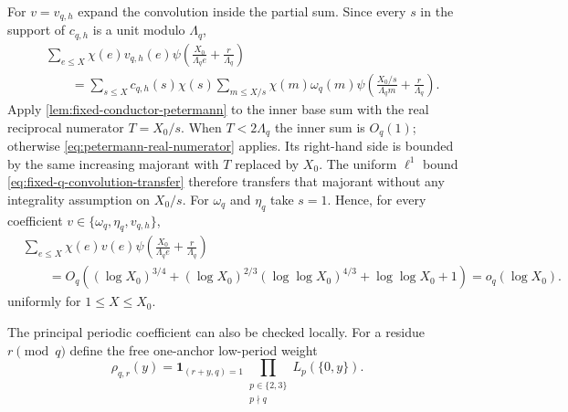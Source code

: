 \documentclass[11pt]{article}
\theoremstyle{definition}
\theoremstyle{remark}
\newcommand{\1}{\mathbf 1}
\begin{document}
For $v=v_{q,h}$ expand the convolution inside the partial sum.  Since every
$s$ in the support of $c_{q,h}$ is a unit modulo $\Lambda_q$,
\begin{align*}
&\sum_{e\le X}\chi(e)v_{q,h}(e)
\psi\!\left(\frac{X_0}{\Lambda_q e}+\frac r{\Lambda_q}\right)\\
&\qquad=\sum_{s\le X}c_{q,h}(s)\chi(s)
\sum_{m\le X/s}\chi(m)\omega_q(m)
\psi\!\left(\frac{X_0/s}{\Lambda_q m}+\frac r{\Lambda_q}\right).
\end{align*}
Apply \cref{lem:fixed-conductor-petermann} to the inner base sum with the real
reciprocal numerator $T=X_0/s$.  When $T<2\Lambda_q$ the inner sum is
$O_q(1)$; otherwise \eqref{eq:petermann-real-numerator} applies.  Its right-hand
side is bounded by the same increasing majorant with $T$ replaced by $X_0$.
The uniform $\ell^1$ bound \eqref{eq:fixed-q-convolution-transfer} therefore
transfers that majorant without any integrality assumption on $X_0/s$.
For $\omega_q$ and $\eta_q$ take $s=1$.  Hence, for every coefficient
$v\in\{\omega_q,\eta_q,v_{q,h}\}$,
\begin{equation}\label{eq:petermann-q}
\begin{aligned}
&\sum_{e\le X}\chi(e)v(e)
\psi\!\left(\frac{X_0}{\Lambda_q e}+\frac r{\Lambda_q}\right)\\
&\qquad=O_q\!\left(
(\log X_0)^{3/4}
+(\log X_0)^{2/3}(\log\log X_0)^{4/3}
+\log\log X_0+1
\right)
=o_q(\log X_0).
\end{aligned}
\end{equation}
uniformly for $1\le X\le X_0$.

The principal periodic coefficient can also be checked locally.  For a residue
$r\pmod q$ define the free one-anchor low-period weight
\begin{equation}\label{eq:rho-free-q}
\rho_{q,r}(y)
=\1_{(r+y,q)=1}
\prod_{\substack{p\in\{2,3\}\\p\nmid q}}L_p(\{0,y\}).
\end{equation}
\end{document}
